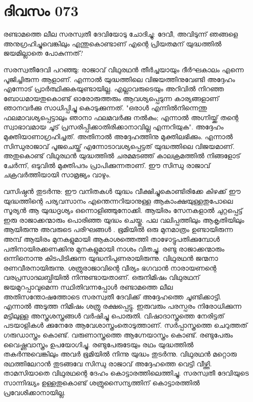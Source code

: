  
\section{ദിവസം 073}


രണ്ടാമത്തെ ലീല സരസ്വതീ ദേവിയോടു ചോദിച്ചു: ദേവീ, അവിടുന്ന് ഞങ്ങളെ അനുഗ്രഹിച്ചുവെങ്കിലും എന്തുകൊണ്ടാണ്‌ എന്റെ പ്രിയതമന്‌ യുദ്ധത്തില്‍ ജയമില്ലാതെ പോകുന്നത്‌? 

സരസ്വതീദേവി പറഞ്ഞു: രാജാവ്‌ വിഥുരഥന്‍ തീര്‍ച്ചയായും ദീര്‍ഘകാലം എന്നെ പൂജിച്ചിരുന്ന ആളാണ്‌. എന്നാല്‍ യുദ്ധത്തിലെ വിജയത്തിനുവേണ്ടി അദ്ദേഹം എന്നോട്‌ പ്രാര്‍ത്ഥിക്കുകയുണ്ടായില്ല. എല്ലാവരുടെയും അറിവില്‍ നിറഞ്ഞ ബോധമായതുകൊണ്ട്‌ ഓരോരുത്തരും ആവശ്യപ്പെടുന്ന കാര്യങ്ങളാണ്‌ ഞാനവര്‍ക്കു സാധിപ്പിച്ചു കൊടുക്കുന്നത്‌. "ഒരാള്‍ എന്നില്‍നിന്നെന്തു ഫലമാവശ്യപ്പെട്ടാലും ഞാനാ ഫലമവര്‍ക്കു നല്‍കും; എന്നാല്‍ അഗ്നിയ്ക്ക്‌ തന്റെ സ്വാഭാവമായ ചൂട്‌ പ്രസരിപ്പിക്കാതിരിക്കാനാവില്ല എന്നറിയുക". അദ്ദേഹം മുക്തിയാണാഗ്രഹിച്ചത്‌. അതിനാല്‍ അദ്ദേഹത്തിനു മുക്തിലഭിക്കും. എന്നാല്‍ സിന്ധുരാജാവ്‌ പൂജചെയ്ത്‌ എന്നോടാവശ്യപ്പെട്ടത്‌ യുദ്ധത്തിലെ വിജയമാണ്‌. അതുകൊണ്ട്‌ വിഥുരഥന്‍ യുദ്ധത്തില്‍ ചരമമടഞ്ഞ്‌ കാലക്രമത്തില്‍ നിങ്ങളോട്‌ ചേര്‍ന്ന്, ഒടുവില്‍ മുക്തിപദം പ്രാപിക്കുന്നതാണ്‌. ഈ സിന്ധു രാജാവ്‌ ചക്രവര്‍ത്തിയായി സാമ്രജ്യം വാഴും.

വസിഷ്ഠന്‍ തുടര്‍ന്നു: ഈ വനിതകള്‍ യുദ്ധം വീക്ഷിച്ചുകൊണ്ടിരിക്കേ കിഴക്ക്‌ ഈ യുദ്ധത്തിന്റെ പര്യവസാനം എന്തെന്നറിയാനുള്ള ആകാംക്ഷയുള്ളതുപോലെ സൂര്യന്‍ ആ യുദ്ധദൃശ്യം ഒന്നൊളിഞ്ഞുനോക്കി. ആയിരം സേനകളാല്‍ ചുറ്റപ്പെട്ട്‌ ഇരു രാജാക്കന്മാരും പൊരിഞ്ഞ യുദ്ധം ചെയ്തു. പല വലിപ്പത്തിലും ആകൃതിയിലും ആയിരുന്നു അവരുടെ പരിഘങ്ങള്‍ . ഭൂമിയില്‍ ഒരു മുനമാത്രം ഉണ്ടായിരുന്ന അമ്പ്‌ ആയിരം മുനകളുമായി ആകാശത്തെത്തി താഴോട്ടുപതിക്കുമ്പോള്‍ പതിനായിരക്കണക്കിനു മുനകളുമായി നാശം വിതച്ചു. രണ്ടു രാജാക്കന്മാരും ഒന്നിനൊന്നു കിടപിടിക്കുന്ന യുദ്ധനിപുണരായിരുന്നു. വിഥുരഥന്‍ ജന്മനാ രണവീരനായിരുന്നു. ശത്രുരാജാവിന്റെ വീര്യം ഭഗവാന്‍ നാരായണന്റെ വരപ്രസാദലബ്ധിയില്‍ നിന്നുണ്ടായതാണ്‌. ഒരുനിമിഷം വിഥുരഥന്‌ ജയമുറപ്പാവുമെന്ന സ്ഥിതിവന്നപ്പോള്‍ രണ്ടാമത്തെ ലീല അതിസന്തോഷത്തോടെ സരസ്വതീ ദേവിക്ക്‌ അദ്ദേഹത്തെ ചൂണ്ടിക്കാട്ടി. എന്നാല്‍ അടുത്ത നിമിഷം ശത്രു രക്ഷപ്പെട്ടു. ഇരുവരും പരസ്പരം നിരോധിക്കുന്ന മട്ടിലുള്ള അസ്ത്രശസ്ത്രങ്ങള്‍ വര്‍ഷിച്ചു പൊരുതി. വിഷാദാസ്ത്രത്തെ നേരിട്ടത്‌ പടയാളികള്‍ ക്കുനേരേ ആവേശാസ്ത്രംതൊടുത്താണ്‌. സര്‍പ്പാസ്ത്രത്തെ ചെറുത്തത്‌ ഗരുഡാസ്ത്രം കൊണ്ട്‌. വരുണാസ്ത്രത്തെ ആഗ്നേയാസ്ത്രം കൊണ്ട്‌. രണ്ടുപേരും വൈഷ്ണവാസ്ത്രം ഉപയോഗിച്ചു. രണ്ടുപേരുടേയും രഥം യുദ്ധത്തില്‍ തകര്‍ന്നുവെങ്കിലും അവര്‍ ഭൂമിയില്‍ നിന്നു യുദ്ധം തുടര്‍ന്നു. വിഥുരഥന്‍ മറ്റൊരു രഥത്തിലേറാന്‍ തുടങ്ങവേ സിന്ധു രാജാവ്‌ അദ്ദേഹത്തെ വെട്ടി വീഴ്ത്തി. താമസിയാതെ വിഥുരഥന്റെ ദേഹം കൊട്ടാരത്തിലെത്തിച്ചു. സരസ്വതീ ദേവിയുടെ സാന്നിദ്ധ്യം ഉള്ളതുകൊണ്ട്‌ ശത്രുസൈന്യത്തിന്‌ കൊട്ടാരത്തില്‍ പ്രവേശിക്കാനായില്ല.
